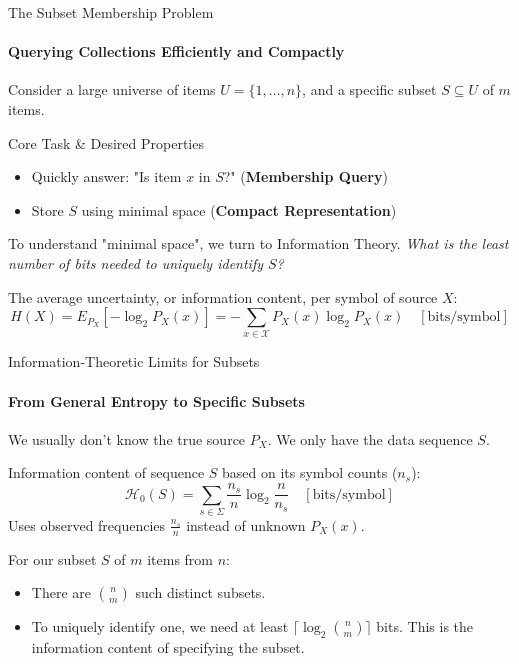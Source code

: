 
\begin{frame}{The Subset Membership Problem}
    \framesubtitle{Querying Collections Efficiently and Compactly}

    Consider a large universe of items $U = \{1, \dots, n\}$, and a specific subset $S \subseteq U$ of $m$ items.

    \begin{alertblock}{Core Task \& Desired Properties}
        \begin{itemize}
            \item Quickly answer: "Is item $x$ in $S$?" (\textbf{Membership Query})
            \item Store $S$ using minimal space (\textbf{Compact Representation})
        \end{itemize}
    \end{alertblock}
    \pause %

    To understand "minimal space", we turn to Information Theory.
    \textit{What is the least number of bits needed to uniquely identify $S$?}
    \begin{definition}
        The average uncertainty, or information content, per symbol of source $X$:
        \[ H(X) = E_{P_X}[-\log_2 P_X(x)] = -\sum_{x \in \mathcal{X}} P_X(x) \log_2 P_X(x) \quad [\text{bits/symbol}] \]
    \end{definition}
\end{frame}

\begin{frame}{Information-Theoretic Limits for Subsets}
    \framesubtitle{From General Entropy to Specific Subsets}
    We usually don't know the true source $P_X$. We only have the data sequence $S$.
    \pause
    \begin{definition}
        Information content of sequence $S$ based on its symbol counts ($n_s$):
        \[ \mathcal{H}_0(S) = \sum_{s \in \Sigma} \frac{n_s}{n} \log_2 \frac{n}{n_s} \quad [\text{bits/symbol}] \]
        \vspace{-0.2em}
        Uses observed frequencies $\frac{n_s}{n}$ instead of unknown $P_X(x)$.
    \end{definition}

    \pause %
    For our subset $S$ of $m$ items from $n$:
    \begin{itemize}
        \item There are $\binom{n}{m}$ such distinct subsets.
        \item To uniquely identify one, we need at least $\lceil \log_2 \binom{n}{m} \rceil$ bits. This is the \alert{information content} of specifying the subset.
    \end{itemize}

\end{frame}

